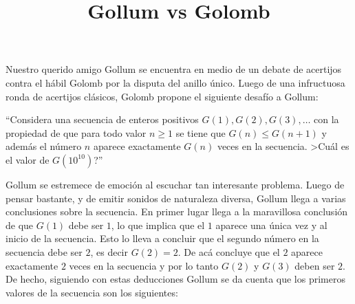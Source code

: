 \documentclass{oci}
\title{Gollum vs Golomb}
\begin{document}
\begin{problemDescription}
Nuestro querido amigo Gollum se encuentra en medio de un debate de acertijos contra el hábil Golomb por la disputa del anillo único.
Luego de una infructuosa ronda de acertijos clásicos, Golomb propone el siguiente desafío a Gollum:

``Considera una secuencia de enteros positivos $G(1), G(2), G(3),\dots$ con la propiedad de que para todo valor $n \geq 1$ se tiene que $G(n) \leq G(n+1)$ y además el número $n$ aparece exactamente $G(n)$ veces en la secuencia. >Cuál es el valor de $G(10^{10})$?''

Gollum se estremece de emoción al escuchar tan interesante problema.
Luego de pensar bastante, y de emitir sonidos de naturaleza diversa, 
Gollum llega a varias conclusiones sobre la secuencia.
En primer lugar llega a la maravillosa conclusión de que $G(1)$ debe ser $1$, lo que implica
que el $1$ aparece una única vez y al inicio de la secuencia.
Esto lo lleva a concluir que el segundo número en la secuencia debe ser $2$, es decir
$G(2)=2$.
De acá concluye que el $2$ aparece exactamente $2$ veces en la secuencia y por lo tanto $G(2)$ y $G(3)$
deben ser $2$.
De hecho, siguiendo con estas deducciones Gollum se da cuenta que los primeros valores de la secuencia son los siguientes:



\end{problemDescription}
\end{document}
